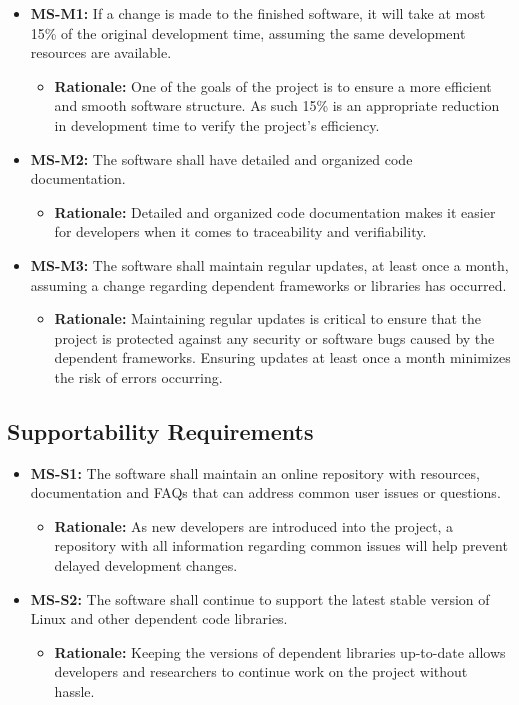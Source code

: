 \documentclass[12pt]{article}
\newcommand{\lips}{\textit{Insert your content here.}}
\begin{document}
\begin{itemize}
  \item \textbf{MS-M1:} If a change is made to the finished software, it will take at most 15\% of the original development time, assuming the same development resources are available.
    \begin{itemize}
      \item \textbf{Rationale:} One of the goals of the project is to ensure a more efficient and smooth software structure. As such 15\% is an appropriate reduction in development time to verify the project’s efficiency. 
    \end{itemize}
  \item \textbf{MS-M2:} The software shall have detailed and organized code documentation.
  \begin{itemize}
    \item \textbf{Rationale:} Detailed and organized code documentation makes it easier for developers when it comes to traceability and verifiability. 
  \end{itemize}
  \item \textbf{MS-M3:} The software shall maintain regular updates, at least once a month, assuming a change regarding dependent frameworks or libraries has occurred. 
  \begin{itemize}
    \item \textbf{Rationale:} Maintaining regular updates is critical to ensure that the project is protected against any security or software bugs caused by the dependent frameworks. Ensuring updates at least once a month minimizes the risk of errors occurring. 
  \end{itemize}
\end{itemize}

\subsection{Supportability Requirements}
\begin{itemize}
  \item \textbf{MS-S1:} The software shall maintain an online repository with resources, documentation and FAQs that can address common user issues or questions.
  \begin{itemize}
    \item \textbf{Rationale:} As new developers are introduced into the project, a repository with all information regarding common issues will help prevent delayed development changes.
  \end{itemize}
  \item \textbf{MS-S2:} The software shall continue to support the latest stable version of Linux and other dependent code libraries.
  \begin{itemize}
    \item \textbf{Rationale:} Keeping the versions of dependent libraries up-to-date allows developers and researchers to continue work on the project without hassle.
  \end{itemize}
\end{itemize}
\end{document}

